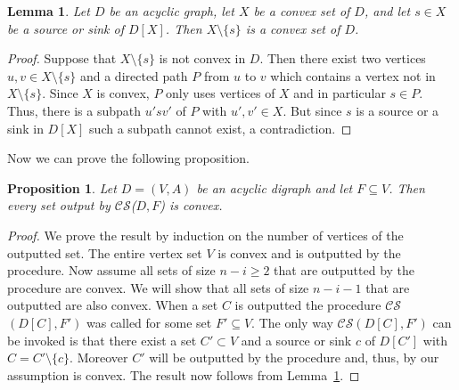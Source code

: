 \documentclass[11pt]{article}
\newcommand{\2}{\vspace{0.2 cm}}
\newtheorem{lemma}[theorem]{Lemma}
\newtheorem{proposition}[theorem]{Proposition}
\newcommand\cs{{$\mathcal{CS}$}}
\begin{document}
\begin{lemma}\label{lem:delete}
Let $D$ be an acyclic graph, let $X$ be a convex set of $D$, and let
$s\in X$ be a source or sink of $D[X]$. Then $X\setminus \{s\}$ is a
convex set of $D$.
\end{lemma}
\begin{proof}
Suppose that  $X\setminus \{s\}$ is not convex in $D$. Then there
exist two vertices $u,v\in X\setminus \{s\}$ and a directed path $P$
from $u$ to $v$ which contains a vertex not in $X\setminus \{s\}$.
Since $X$ is convex, $P$ only uses vertices of $X$ and in particular $s\in P$. 
Thus, there is a subpath $u'sv'$ of $P$ with $u',v'\in X$.
But since $s$ is a source or a sink in $D[X]$ such a subpath cannot
exist, a contradiction.
\end{proof}

Now we can prove the following proposition.

\begin{proposition}\label{prop:convex}
Let $D=(V,A)$ be an acyclic digraph and let $F\subseteq V$. Then
every set output by {\cs}($D,F$) is convex.
\end{proposition}
\begin{proof}
We prove the result by induction on the number of vertices of the
outputted set. The entire vertex set $V$ is convex and is outputted
by the procedure. Now assume all sets of size $n-i\geq 2$ that are
outputted by the procedure are convex. We will show that all sets of
size $n-i-1$ that are outputted are also convex. When a set $C$ is
outputted the procedure  {\cs}$(D[C],F')$ was called for some set
$F'\subseteq V$. The only way {\cs}$(D[C],F')$ can be invoked is
that there exist a set $C'\subset V$ and a source or sink $c$ of
$D[C']$ with $C=C'\setminus \{c\}$. Moreover $C'$ will be outputted
by the procedure and, thus, by our assumption is convex. The result
now follows from Lemma~\ref{lem:delete}.
\end{proof}
\end{document}
